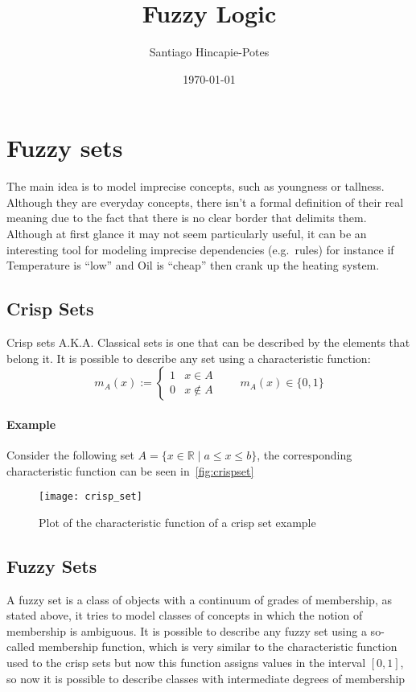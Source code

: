 \documentclass[]{article}
\title{Fuzzy Logic}
\author{Santiago Hincapie-Potes}
\date{\today}
\begin{document}
\maketitle


\section{Fuzzy sets}
The main idea is to model imprecise concepts, such as youngness or tallness.
Although they are everyday concepts, there isn't a formal definition of their
real meaning due to the fact that there is no clear border that delimits them.\\
Although at first glance it may not seem particularly useful, it can be an
interesting tool for modeling imprecise dependencies (e.g.\ rules) for instance
if Temperature is ``low'' and Oil is ``cheap'' then crank up the heating system.

\subsection{Crisp Sets}
Crisp sets A.K.A. Classical sets is one that can be described by the elements that
belong it. It is possible to describe any set using a characteristic function:
\[ m_{A}(x) := \begin{cases}
      1 & x\in A \\
      0 & x\notin A
   \end{cases} \qquad m_{A}(x) \in \{0, 1\}
\]
\paragraph{Example} Consider the following set
\( A = \{x \in \mathbb{R} \mid a \leq x \leq b \}\),
the corresponding characteristic function can be seen in~\autoref{fig:crispset}

\begin{figure}[ht!]
  \centering
  \texttt{[image: crisp\_set]}
  \caption{Plot of the characteristic function of a crisp set example~\label{fig:crispset}}
\end{figure}

\subsection{Fuzzy Sets~\citep{Zadeh1965}}
A fuzzy set is a class of objects with a continuum of grades of membership,
as stated above, it tries to model classes of concepts in which the notion of
membership is ambiguous. It is possible to describe any fuzzy set using a
so-called membership function, which is very similar to the characteristic
function used to the crisp sets but now this function assigns values in the
interval $[0, 1]$, so now it is possible to describe classes with intermediate
degrees of membership
\end{document}
